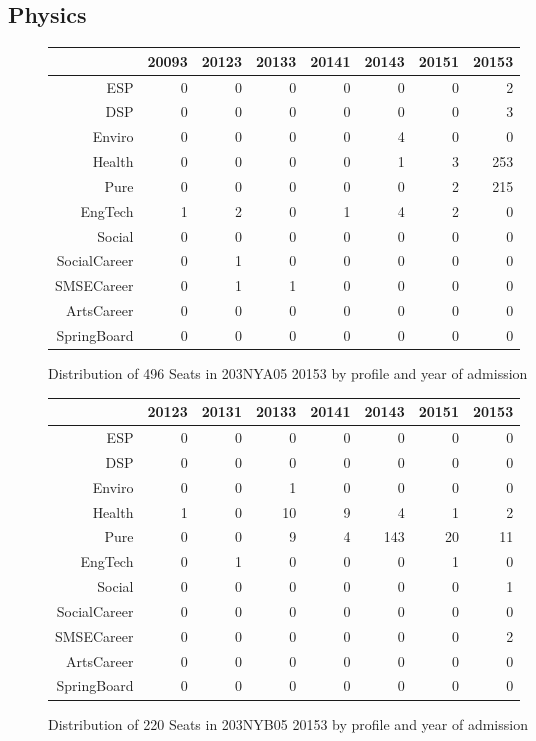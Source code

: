\documentclass{article}\usepackage[]{graphicx}\usepackage[]{color}
\begin{document}
\subsection{Physics}
\begin{figure}[H]
\centering
\begin{tabular}{rrrrrrrr}
  \hline
 & 20093 & 20123 & 20133 & 20141 & 20143 & 20151 & 20153 \\ 
  \hline
ESP &   0 &   0 &   0 &   0 &   0 &   0 &   2 \\ 
  DSP &   0 &   0 &   0 &   0 &   0 &   0 &   3 \\ 
  Enviro &   0 &   0 &   0 &   0 &   4 &   0 &   0 \\ 
  Health &   0 &   0 &   0 &   0 &   1 &   3 & 253 \\ 
  Pure &   0 &   0 &   0 &   0 &   0 &   2 & 215 \\ 
  EngTech &   1 &   2 &   0 &   1 &   4 &   2 &   0 \\ 
  Social &   0 &   0 &   0 &   0 &   0 &   0 &   0 \\ 
  SocialCareer &   0 &   1 &   0 &   0 &   0 &   0 &   0 \\ 
  SMSECareer &   0 &   1 &   1 &   0 &   0 &   0 &   0 \\ 
  ArtsCareer &   0 &   0 &   0 &   0 &   0 &   0 &   0 \\ 
  SpringBoard &   0 &   0 &   0 &   0 &   0 &   0 &   0 \\ 
   \hline
\end{tabular}
\caption{Distribution of 496 Seats in 203NYA05 20153 by profile and year of admission} 
\end{figure}
\begin{figure}[H]
\centering
\begin{tabular}{rrrrrrrr}
  \hline
 & 20123 & 20131 & 20133 & 20141 & 20143 & 20151 & 20153 \\ 
  \hline
ESP &   0 &   0 &   0 &   0 &   0 &   0 &   0 \\ 
  DSP &   0 &   0 &   0 &   0 &   0 &   0 &   0 \\ 
  Enviro &   0 &   0 &   1 &   0 &   0 &   0 &   0 \\ 
  Health &   1 &   0 &  10 &   9 &   4 &   1 &   2 \\ 
  Pure &   0 &   0 &   9 &   4 & 143 &  20 &  11 \\ 
  EngTech &   0 &   1 &   0 &   0 &   0 &   1 &   0 \\ 
  Social &   0 &   0 &   0 &   0 &   0 &   0 &   1 \\ 
  SocialCareer &   0 &   0 &   0 &   0 &   0 &   0 &   0 \\ 
  SMSECareer &   0 &   0 &   0 &   0 &   0 &   0 &   2 \\ 
  ArtsCareer &   0 &   0 &   0 &   0 &   0 &   0 &   0 \\ 
  SpringBoard &   0 &   0 &   0 &   0 &   0 &   0 &   0 \\ 
   \hline
\end{tabular}
\caption{Distribution of 220 Seats in 203NYB05 20153 by profile and year of admission} 
\end{figure}
\end{document}
